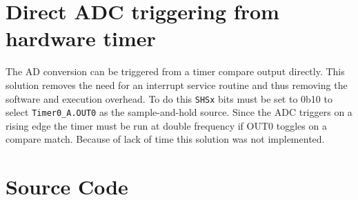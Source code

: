 \documentclass{article}
\begin{document}
\section{Direct ADC triggering from hardware timer}
The AD conversion can be triggered from a timer compare output directly.
This solution removes the need for an interrupt service routine and thus removing the software and execution overhead.
To do this \verb'SHSx' bits must be set to 0b10 to select \verb'Timer0_A.OUT0' as the sample-and-hold source.
Since the ADC triggers on a rising edge the timer must be run at double frequency if OUT0 toggles on a compare match.
Because of lack of time this solution was not implemented.


\section{Source Code}
\end{document}
